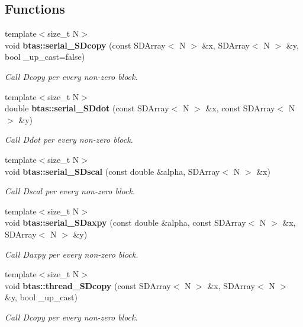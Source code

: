 \subsection*{Functions}
\begin{DoxyCompactItemize}
\item 
{\footnotesize template$<$size\-\_\-t N$>$ }\\void {\bf btas\-::serial\-\_\-\-S\-Dcopy} (const S\-D\-Array$<$ N $>$ \&x, S\-D\-Array$<$ N $>$ \&y, bool \-\_\-up\-\_\-cast=false)
\begin{DoxyCompactList}\small\item\em Call Dcopy per every non-\/zero block. \end{DoxyCompactList}\item 
{\footnotesize template$<$size\-\_\-t N$>$ }\\double {\bf btas\-::serial\-\_\-\-S\-Ddot} (const S\-D\-Array$<$ N $>$ \&x, const S\-D\-Array$<$ N $>$ \&y)
\begin{DoxyCompactList}\small\item\em Call Ddot per every non-\/zero block. \end{DoxyCompactList}\item 
{\footnotesize template$<$size\-\_\-t N$>$ }\\void {\bf btas\-::serial\-\_\-\-S\-Dscal} (const double \&alpha, S\-D\-Array$<$ N $>$ \&x)
\begin{DoxyCompactList}\small\item\em Call Dscal per every non-\/zero block. \end{DoxyCompactList}\item 
{\footnotesize template$<$size\-\_\-t N$>$ }\\void {\bf btas\-::serial\-\_\-\-S\-Daxpy} (const double \&alpha, const S\-D\-Array$<$ N $>$ \&x, S\-D\-Array$<$ N $>$ \&y)
\begin{DoxyCompactList}\small\item\em Call Daxpy per every non-\/zero block. \end{DoxyCompactList}\item 
{\footnotesize template$<$size\-\_\-t N$>$ }\\void {\bf btas\-::thread\-\_\-\-S\-Dcopy} (const S\-D\-Array$<$ N $>$ \&x, S\-D\-Array$<$ N $>$ \&y, bool \-\_\-up\-\_\-cast)
\begin{DoxyCompactList}\small\item\em Call Dcopy per every non-\/zero block. \end{DoxyCompactList}\item 

\end{DoxyCompactItemize}
